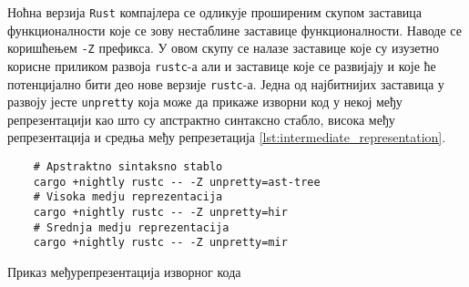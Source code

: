 Ноћна верзија \verb|Rust| компајлера се одликује проширеним скупом заставица функционалности које се зову 
нестаблине заставице функционалности. Наводе се коришћењем \verb|-Z| префикса. У овом скупу се налазе 
заставице које су изузетно корисне приликом развоја \verb|rustc|-а али и заставице које се развијају
и које ће потенцијално бити део нове верзије \verb|rustc|-а. Једна од најбитнијих заставица у развоју 
јесте \verb|unpretty| која може да прикаже изворни код у некој међу репрезентацији као што су
апстрактно синтаксно стабло, висока међу репрезентација и средња међу репрезетација \ref{lst:intermediate_representation}.

\begin{listing}[H]
\begin{verbatim}
    # Apstraktno sintaksno stablo 
    cargo +nightly rustc -- -Z unpretty=ast-tree
    # Visoka medju reprezentacija
    cargo +nightly rustc -- -Z unpretty=hir
    # Srednja medju reprezentacija
    cargo +nightly rustc -- -Z unpretty=mir
\end{verbatim}
\caption{Приказ међурепрезентација изворног кода}
\label{lst:intermediate_representation}
\end{listing}